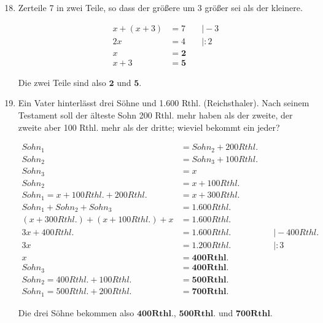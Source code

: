 \documentclass[a4paper,10pt]{article} %
\begin{document}
\begin{enumerate}

  \setcounter{enumi}{17}

  \item Zerteile 7 in zwei Teile, so dass der größere um 3 größer sei als der kleinere.

    \[
      \begin{aligned}
        x + (x + 3) &= 7 &\quad\big| - 3 \\
        2x &= 4 &\quad\big| : 2 \\
        x &= \mathbf{2} \\
        x + 3 &= \mathbf{5}
      \end{aligned}
    \]

    Die zwei Teile sind also \(\mathbf{2}\) und \(\mathbf{5}\).

  \item Ein Vater hinterlässt drei Söhne und 1.600 Rthl. (Reichsthaler).
    Nach seinem Testament soll der älteste Sohn 200 Rthl. mehr haben als der zweite,
    der zweite aber 100 Rthl. mehr als der dritte; wieviel bekommt ein jeder?

    \[
      \begin{aligned}
        Sohn_1 &= Sohn_2 + 200 Rthl. \\
        Sohn_2 &= Sohn_3 + 100 Rthl. \\
        Sohn_3 &= x \\
        Sohn_2 &= x + 100 Rthl. \\
        Sohn_1 = x + 100 Rthl. + 200 Rthl. &= x + 300 Rthl. \\
        Sohn_1 + Sohn_2 + Sohn_3 &= 1.600 Rthl. \\
        (x + 300 Rthl.) + (x + 100 Rthl.) + x &= 1.600 Rthl. \\
        3x + 400 Rthl. &= 1.600 Rthl. &\quad\big| - 400 Rthl. \\
        3x &= 1.200 Rthl. &\quad\big| : 3 \\
        x &= \mathbf{400 Rthl.} \\
        Sohn_3 &= \mathbf{400 Rthl.} \\
        Sohn_2 = 400 Rthl. + 100 Rthl. &= \mathbf{500 Rthl.} \\
        Sohn_1 = 500 Rthl. + 200 Rthl. &= \mathbf{700 Rthl.}
      \end{aligned}
    \]

    Die drei Söhne bekommen also \(\mathbf{400 Rthl.}\), \(\mathbf{500 Rthl.}\) und \(\mathbf{700 Rthl.}\)

\end{enumerate}
\end{document}
